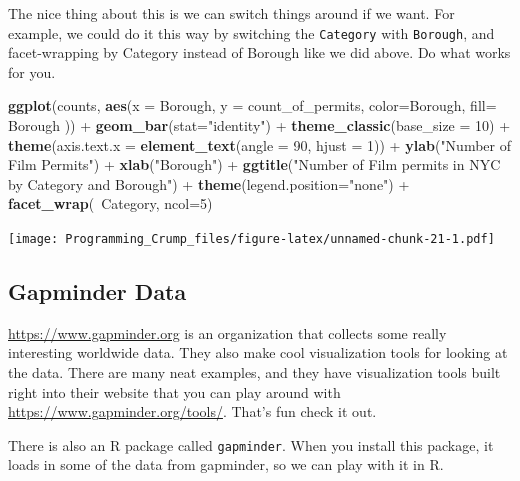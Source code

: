 \documentclass[]{book}
\newenvironment{Shaded}{\begin{snugshade}}{\end{snugshade}}
\newcommand{\KeywordTok}[1]{\textcolor[rgb]{0.13,0.29,0.53}{\textbf{{#1}}}}
\newcommand{\DataTypeTok}[1]{\textcolor[rgb]{0.13,0.29,0.53}{{#1}}}
\newcommand{\DecValTok}[1]{\textcolor[rgb]{0.00,0.00,0.81}{{#1}}}
\newcommand{\StringTok}[1]{\textcolor[rgb]{0.31,0.60,0.02}{{#1}}}
\newcommand{\NormalTok}[1]{{#1}}
\theoremstyle{definition}
\theoremstyle{definition}
\theoremstyle{definition}
\theoremstyle{remark}
\begin{document}
The nice thing about this is we can switch things around if we want. For
example, we could do it this way by switching the \texttt{Category} with
\texttt{Borough}, and facet-wrapping by Category instead of Borough like
we did above. Do what works for you.

\begin{Shaded}
\begin{Highlighting}[]
\KeywordTok{ggplot}\NormalTok{(counts, }\KeywordTok{aes}\NormalTok{(}\DataTypeTok{x =} \NormalTok{Borough, }\DataTypeTok{y =} \NormalTok{count_of_permits, }
                   \DataTypeTok{color=}\NormalTok{Borough, }
                   \DataTypeTok{fill=} \NormalTok{Borough )) +}
\StringTok{  }\KeywordTok{geom_bar}\NormalTok{(}\DataTypeTok{stat=}\StringTok{"identity"}\NormalTok{) +}\StringTok{ }
\StringTok{  }\KeywordTok{theme_classic}\NormalTok{(}\DataTypeTok{base_size =} \DecValTok{10}\NormalTok{) +}
\StringTok{  }\KeywordTok{theme}\NormalTok{(}\DataTypeTok{axis.text.x =} \KeywordTok{element_text}\NormalTok{(}\DataTypeTok{angle =} \DecValTok{90}\NormalTok{, }\DataTypeTok{hjust =} \DecValTok{1}\NormalTok{)) +}
\StringTok{  }\KeywordTok{ylab}\NormalTok{(}\StringTok{"Number of Film Permits"}\NormalTok{) +}\StringTok{ }
\StringTok{  }\KeywordTok{xlab}\NormalTok{(}\StringTok{"Borough"}\NormalTok{) +}
\StringTok{  }\KeywordTok{ggtitle}\NormalTok{(}\StringTok{"Number of Film permits in NYC by Category and Borough"}\NormalTok{) +}
\StringTok{  }\KeywordTok{theme}\NormalTok{(}\DataTypeTok{legend.position=}\StringTok{"none"}\NormalTok{) +}
\StringTok{  }\KeywordTok{facet_wrap}\NormalTok{(~Category, }\DataTypeTok{ncol=}\DecValTok{5}\NormalTok{)}
\end{Highlighting}
\end{Shaded}

\texttt{[image: Programming\_Crump\_files/figure-latex/unnamed-chunk-21-1.pdf]}

\subsection{Gapminder Data}\label{gapminder-data}

\url{https://www.gapminder.org} is an organization that collects some
really interesting worldwide data. They also make cool visualization
tools for looking at the data. There are many neat examples, and they
have visualization tools built right into their website that you can
play around with \url{https://www.gapminder.org/tools/}. That's fun
check it out.

There is also an R package called \texttt{gapminder}. When you install
this package, it loads in some of the data from gapminder, so we can
play with it in R.
\end{document}

